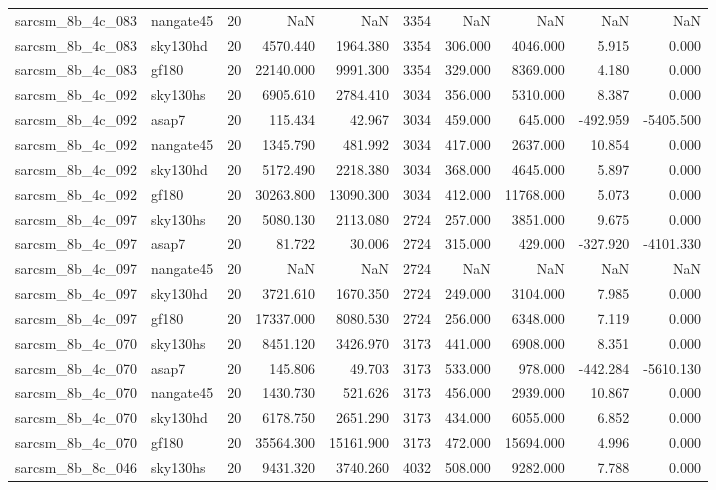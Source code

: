\documentclass{article}
\begin{document}
\begin{longtable}{llrrrrrrrr}
sarcsm\_8b\_4c\_083 & nangate45 & 20 & NaN & NaN & 3354 & NaN & NaN & NaN & NaN \\
sarcsm\_8b\_4c\_083 & sky130hd & 20 & 4570.440 & 1964.380 & 3354 & 306.000 & 4046.000 & 5.915 & 0.000 \\
sarcsm\_8b\_4c\_083 & gf180 & 20 & 22140.000 & 9991.300 & 3354 & 329.000 & 8369.000 & 4.180 & 0.000 \\
sarcsm\_8b\_4c\_092 & sky130hs & 20 & 6905.610 & 2784.410 & 3034 & 356.000 & 5310.000 & 8.387 & 0.000 \\
sarcsm\_8b\_4c\_092 & asap7 & 20 & 115.434 & 42.967 & 3034 & 459.000 & 645.000 & -492.959 & -5405.500 \\
sarcsm\_8b\_4c\_092 & nangate45 & 20 & 1345.790 & 481.992 & 3034 & 417.000 & 2637.000 & 10.854 & 0.000 \\
sarcsm\_8b\_4c\_092 & sky130hd & 20 & 5172.490 & 2218.380 & 3034 & 368.000 & 4645.000 & 5.897 & 0.000 \\
sarcsm\_8b\_4c\_092 & gf180 & 20 & 30263.800 & 13090.300 & 3034 & 412.000 & 11768.000 & 5.073 & 0.000 \\
sarcsm\_8b\_4c\_097 & sky130hs & 20 & 5080.130 & 2113.080 & 2724 & 257.000 & 3851.000 & 9.675 & 0.000 \\
sarcsm\_8b\_4c\_097 & asap7 & 20 & 81.722 & 30.006 & 2724 & 315.000 & 429.000 & -327.920 & -4101.330 \\
sarcsm\_8b\_4c\_097 & nangate45 & 20 & NaN & NaN & 2724 & NaN & NaN & NaN & NaN \\
sarcsm\_8b\_4c\_097 & sky130hd & 20 & 3721.610 & 1670.350 & 2724 & 249.000 & 3104.000 & 7.985 & 0.000 \\
sarcsm\_8b\_4c\_097 & gf180 & 20 & 17337.000 & 8080.530 & 2724 & 256.000 & 6348.000 & 7.119 & 0.000 \\
sarcsm\_8b\_4c\_070 & sky130hs & 20 & 8451.120 & 3426.970 & 3173 & 441.000 & 6908.000 & 8.351 & 0.000 \\
sarcsm\_8b\_4c\_070 & asap7 & 20 & 145.806 & 49.703 & 3173 & 533.000 & 978.000 & -442.284 & -5610.130 \\
sarcsm\_8b\_4c\_070 & nangate45 & 20 & 1430.730 & 521.626 & 3173 & 456.000 & 2939.000 & 10.867 & 0.000 \\
sarcsm\_8b\_4c\_070 & sky130hd & 20 & 6178.750 & 2651.290 & 3173 & 434.000 & 6055.000 & 6.852 & 0.000 \\
sarcsm\_8b\_4c\_070 & gf180 & 20 & 35564.300 & 15161.900 & 3173 & 472.000 & 15694.000 & 4.996 & 0.000 \\
sarcsm\_8b\_8c\_046 & sky130hs & 20 & 9431.320 & 3740.260 & 4032 & 508.000 & 9282.000 & 7.788 & 0.000 \\

\end{longtable}
\end{document}

